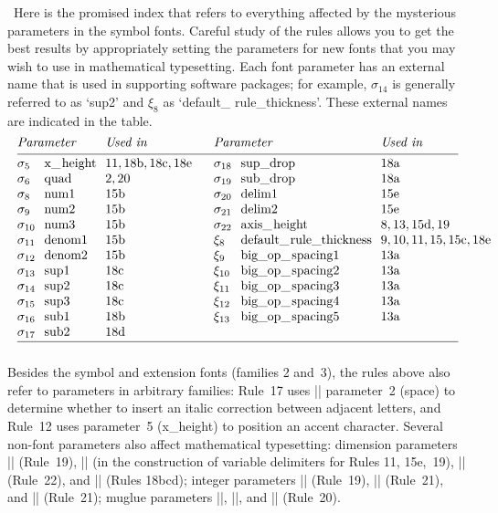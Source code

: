 \medbreak
\def\\{\kern1pt}
 \ Here is the promised index
that refers to everything affected by the mysterious parameters
in the symbol fonts. Careful study of the rules allows you to get the
best results by appropriately setting the parameters for new fonts
that you may wish to use in mathematical typesetting. Each font parameter
has an external name that is used in supporting software packages;
for example, $\sigma_{14}$ is generally referred to as `sup2' and $\xi_8$ as
`default\_\\ rule\_thickness'. These external names are indicated in the table.
$$\vbox{
\halign to\hsize{$#\hfil$\tabskip10pt plus 10pt minus 3pt&
#\hfil&$\rm#\hfil$\quad&
$#\hfil$&#\hfil&$\rm#\hfil$\tabskip0pt\cr
\omit\span\omit\it Parameter&\omit\it Used in\hfil&
\omit\span\omit\it Parameter&\omit\it Used in\hfil\cr
\noalign{\medskip\hrule\smallskip}
\sigma_5&x\_\\height&11, 18b, 18c, 18e&
\sigma_{18}&sup\_drop&18a\cr
\sigma_6&quad&2, 20&
\sigma_{19}&sub\_drop&18a\cr
\sigma_8&num1&15b&
\sigma_{20}&delim1&15e\cr
\sigma_9&num2&15b&
\sigma_{21}&delim2&15e\cr
\sigma_{10}&num3&15b&
\sigma_{22}&axis\_\\height&8, 13, 15d, 19\cr
\sigma_{11}&denom1&15b&
\xi_8&default\_\\rule\_thickness&9, 10, 11, 15, 15c, 18e\cr
\sigma_{12}&denom2&15b&
\xi_9&big\_op\_\\spacing1&13a\cr
\sigma_{13}&sup1&18c&
\xi_{10}&big\_op\_\\spacing2&13a\cr
\sigma_{14}&sup2&18c&
\xi_{11}&big\_op\_\\spacing3&13a\cr
\sigma_{15}&sup3&18c&
\xi_{12}&big\_op\_\\spacing4&13a\cr
\sigma_{16}&sub1&18b&
\xi_{13}&big\_op\_\\spacing5&13a\cr
\sigma_{17}&sub2&18d\cr
\noalign{\smallskip\hrule\medskip}}}$$
Besides the symbol and extension fonts (families 2 and~3), the
rules above also refer to parameters in arbitrary families:
Rule~17 uses |\fontdimen| parameter~2 (space) to determine whether to insert
an italic correction between adjacent letters, and Rule~12 uses parameter~5
(x\_\\height) to position an accent character. Several non-font parameters
also affect mathematical typesetting:
dimension parameters
 \hbox{|\delimitershortfall|} (Rule~19),
 \hbox{|\nulldelimiterspace|} (in
the construction of variable delimiters for Rules 11, 15e,~19),
 \hbox{|\mathsurround|} (Rule~22),
and
 \hbox{|\scriptspace|} (Rules 18bcd);
integer parameters
 \hbox{|\delimiterfactor|} (Rule~19),
 \hbox{|\binoppenalty|} (Rule~21),
and
 \hbox{|\relpenalty|} (Rule~21);
muglue parameters
 \hbox{|\thinmuskip|},
 \hbox{|\medmuskip|,} and
 \hbox{|\thickmuskip|}
(Rule~20).

